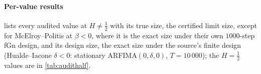\paragraph{Per-value results}  lists every audited value at $H\ne\frac12$ with its true size, the
certified limit size, except for McElroy--Politis at $\beta<0$, where it is the exact size under their own $1000$-step fGn
design, and its design size, the exact size under the source's finite design (Hualde--Iacone $\delta<0$: stationary
ARFIMA$(0,\delta,0)$, $T=10\,000$); the $H=\frac12$ values are in \cref{tab:audithalf}.

{\footnotesize\setlength{\tabcolsep}{4pt}}%

{\footnotesize\setlength{\tabcolsep}{4pt}}%

\FloatBarrier
